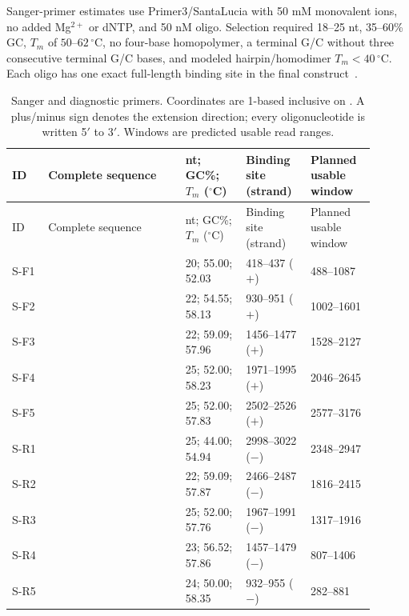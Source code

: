 Sanger-primer estimates use Primer3/SantaLucia with 50 mM monovalent ions, no added Mg$^{2+}$ or dNTP, and 50 nM oligo. Selection required 18--25 nt, 35--60\% GC, $T_m$ of $50$--$62\,^{\circ}$C, no four-base homopolymer, a terminal G/C without three consecutive terminal G/C bases, and modeled hairpin/homodimer $T_m<40\,^{\circ}$C. Each oligo has one exact full-length binding site in the final construct~\cite{Primer3API,MethodM13}.

\begingroup\small
\renewcommand{\arraystretch}{1.0}
\begin{longtable}{@{}L{0.09\linewidth}L{0.34\linewidth}L{0.15\linewidth}L{0.16\linewidth}L{0.16\linewidth}@{}}
\caption{Sanger and diagnostic primers. Coordinates are 1-based inclusive on \ConstructName{}. A plus/minus sign denotes the extension direction; every oligonucleotide is written 5$'$ to 3$'$. Windows are predicted usable read ranges.}\label{tab:sanger}\\
\toprule ID & Complete sequence & nt; GC\%; $T_m$ ($^{\circ}$C) & Binding site (strand) & Planned usable window\\\midrule
\endfirsthead
\toprule ID & Complete sequence & nt; GC\%; $T_m$ ($^{\circ}$C) & Binding site (strand) & Planned usable window\\\midrule
\endhead
\bottomrule\endfoot
S-F1 &  & 20; 55.00; 52.03 & 418--437 ($+$) & 488--1087\\
S-F2 &  & 22; 54.55; 58.13 & 930--951 ($+$) & 1002--1601\\
S-F3 &  & 22; 59.09; 57.96 & 1456--1477 ($+$) & 1528--2127\\
S-F4 &  & 25; 52.00; 58.23 & 1971--1995 ($+$) & 2046--2645\\
S-F5 &  & 25; 52.00; 57.83 & 2502--2526 ($+$) & 2577--3176\\
S-R1 &  & 25; 44.00; 54.94 & 2998--3022 ($-$) & 2348--2947\\
S-R2 &  & 22; 59.09; 57.87 & 2466--2487 ($-$) & 1816--2415\\
S-R3 &  & 25; 52.00; 57.76 & 1967--1991 ($-$) & 1317--1916\\
S-R4 &  & 23; 56.52; 57.86 & 1457--1479 ($-$) & 807--1406\\
S-R5 &  & 24; 50.00; 58.35 & 932--955 ($-$) & 282--881\\
\end{longtable}
\endgroup

